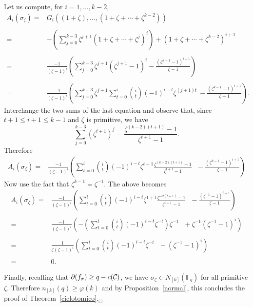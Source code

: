 \documentclass[a4paper,twoside]{article}
\begin{document}
Let us compute,  for $i=1,\ldots,k-2$,
$$\begin{array}{rl}
A_i(\sigma_\zeta)=& G_{i}((1+\zeta),\ldots,(1+\zeta+\cdots +\zeta^{k-2})) \\
&\\
=&-\left({\sum_{j=0}^{k-3}}\zeta^{j+1}
(1+\zeta+\cdots+\zeta^{j})^i\right)+\left(1+\zeta+\cdots+\zeta^{k-2}\right)^{i+1}\\
&\\
  =& \frac{-1}{(\zeta-1)^i}\left(\displaystyle{\sum_{j=0}^{k-3}}
\zeta^{j+1}(\zeta^{j+1}-1)^i-\frac{(\zeta^{k-1}-1)^{i+1}}{\zeta-1}\right)\\
&\\
 =& \frac{-1}{(\zeta-1)^i}\left(\displaystyle{\sum_{j=0}^{k-3}} \zeta^{j+1}\sum_{t=0}^i
\binom{i}{t}(-1)^{i-t}\zeta^{(j+1)t}\ -\frac{(\zeta^{k-1}-1)^{i+1}}{\zeta-1}\right).
\end{array}$$
Interchange the two sums of the last equation and observe that, since $t+1\leq i+1\leq k-1$
and $\zeta$ is primitive, we have
$$\sum_{j=0}^{k-3} (\zeta^{t+1})^j=\frac{\zeta^{(k-2)(t+1)}-1}{\zeta^{t+1}-1}.$$
Therefore
$$\begin{array}{rl}
A_i(\sigma_\zeta)=&
\frac{-1}{(\zeta-1)^i}\left(\displaystyle{\sum_{t=0}^i}\binom{i}{t}(-1)^{i-t}\zeta^{t+1}
\frac{\zeta^{(k-2)(t+1)}-1}{\zeta^{t+1}-1}\ \ \ - \frac{(\zeta^{k-1}-1)^{i+1}}{\zeta-1}\right)
\end{array}$$
Now use the fact that $\zeta^{k-1}=\zeta^{-1}$. The above becomes
$$\begin{array}{rl}
A_i(\sigma_\zeta)=&
\frac{-1}{(\zeta-1)^i}\left(\displaystyle{\sum_{t=0}^i}\binom{i}{t}(-1)^{i-t}\zeta^{1+t}\frac{\zeta^{-2(t+1)}-1}{
\zeta^{t+1}-1}\ \ \ - \frac{(\zeta^{-1}-1)^{i+1}}{\zeta-1}\right)\\
& \\
=&\frac{-1}{(\zeta-1)^i}\left(\displaystyle{-\left(\sum_{t=0}^i\binom{i}{t}(-1)^{i-t}\zeta^{-t}\right)}\zeta^{-1}
\ \ \ + \zeta^{-1}(\zeta^{-1}-1)^{i}\right)\\
& \\
=& \frac{1}{\zeta(\zeta-1)^i}\left(\displaystyle{\sum_{t=0}^i}\binom{i}{t}(-1)^{i-t}\zeta^{-t}\ \ \
 -(\zeta^{-1}-1)^{i}\right)\\
&  \\
=& 0.
\end{array}$$

Finally, recalling that $\partial(f_\sigma)\geq q-c(\cal C)$, we have
$\sigma_\zeta\in N_{[k]}(\mathbb F_q)$ for all primitive $\zeta$. Therefore
$n_{[k]}(q)\geq \varphi(k)$ and by Proposition~\ref{normal},
this concludes the proof of Theorem~\ref{ciclotomico}.\hfill$_\Box$\bigskip
\end{document}
